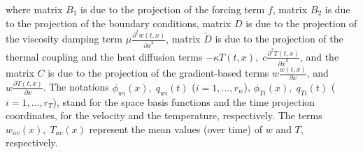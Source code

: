 \documentclass[letterpaper,conference,onecolumn,11pt]{IEEEtran}
\begin{document}
where matrix $B_{1}$ is due to the projection of the forcing term
$f$, matrix $B_{2}$ is due to the projection of the boundary
conditions, matrix $D$ is due to the projection of the viscosity
damping term $\mu\frac{\partial^{2}w(t,x)}{{\partial x}^{2}}$,
matrix $\tilde{D}$ is due to the projection of the thermal
coupling and the heat diffusion terms $-\kappa
T(t,x),\;c\frac{\partial^{2}T(t,x)}{{\partial x}^{2}}$, and the
matrix $C$ is due to the projection of the gradient-based terms
$w\frac{w(t,x)}{\partial x}$, and $w\frac{\partial
T(t,x)}{\partial x}$. The notations $\phi_{w i}(x),\;q_{w i}(t)$
($i=1,...,r_w$), $\phi_{T i}(x),\;q_{T i}(t)$ ($i=1,...,r_T$),
stand for the space basis functions and the time projection
coordinates, for the velocity and the temperature, respectively.
The terms $w_{av}(x),\;T_{av}(x)$ represent the mean values (over
time) of $w$ and $T$, respectively.
\end{document}
